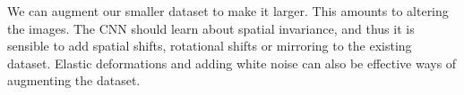 We can augment our smaller dataset to make it larger. This amounts to altering the images. The CNN should learn about spatial invariance, and thus it is sensible to add spatial shifts, rotational shifts or mirroring to the existing dataset. Elastic deformations and adding white noise can also be effective ways of augmenting the dataset.